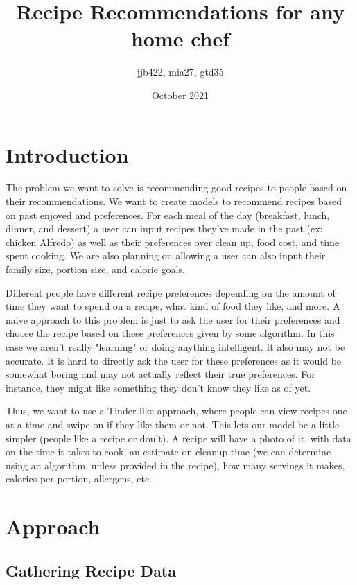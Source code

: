 \documentclass{article}
\title{Recipe Recommendations for any home chef}
\author{jjb422, mia27, gtd35 }
\date{October 2021}
\begin{document}
\maketitle 


\section{Introduction}

The problem we want to solve is recommending good recipes to people based on their recommendations. We want to create models to recommend recipes based on past enjoyed and preferences. For each meal of the day (breakfast, lunch, dinner, and dessert) a user can input recipes they've made in the past (ex: chicken Alfredo) as well as their preferences over clean up, food cost, and time spent cooking. We are also planning on allowing a user can also input their family size, portion size, and calorie goals.

Different people have different recipe preferences depending on the amount of time they want to spend on a recipe, what kind of food they like, and more. A naive approach to this problem is just to ask the user for their preferences and choose the recipe based on these preferences given by some algorithm. In this case we aren't really "learning" or doing anything intelligent. It also may not be accurate. It is hard to directly ask the user for these preferences as it would be somewhat boring and may not actually reflect their true preferences. For instance, they might like something they don't know they like as of yet. 

Thus, we want to use a Tinder-like approach, where people can view recipes one at a time and swipe on if they like them or not. This lets our model be a little simpler (people like a recipe or don't). A recipe will have a photo of it, with data on the time it takes to cook, an estimate on cleanup time (we can determine using an algorithm, unless provided in the recipe), how many servings it makes, calories per portion, allergens, etc.


\section{Approach}

    \subsection{Gathering Recipe Data}
\end{document}
